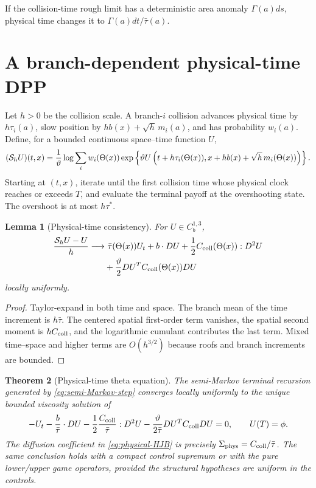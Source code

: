 \documentclass[11pt,reqno]{amsart}
\newtheorem{theorem}{Theorem}[section]
\newtheorem{lemma}[theorem]{Lemma}
\theoremstyle{definition}
\begin{document}
If the collision-time rough limit has a deterministic area anomaly
$\Gamma(a)ds$, physical time changes it to
$\Gamma(a)dt/\bar\tau(a)$.

\section{A branch-dependent physical-time DPP}

Let $h>0$ be the collision scale.  A branch-$i$ collision advances physical
time by $h\tau_i(a)$, slow position by
$hb(x)+\sqrt h\,m_i(a)$, and has probability $w_i(a)$.  Define, for a bounded
continuous space--time function $U$,
\begin{equation}\label{eq:semi-Markov-step}
 (\mathcal S_hU)(t,x)=
 {1\over\vartheta}\log
 \sum_iw_i(\Theta(x))
 \exp\left\{\vartheta
 U\left(t+h\tau_i(\Theta(x)),
 x+hb(x)+\sqrt h\,m_i(\Theta(x))\right)\right\}.
\end{equation}
Starting at $(t,x)$, iterate until the first collision time whose physical clock
reaches or exceeds $T$, and evaluate the terminal payoff at the overshooting
state.  The overshoot is at most $h\tau^*$.

\begin{lemma}[Physical-time consistency]\label{lem:physical-consistency}
For $U\in C_b^{1,3}$,
\begin{align}
 {\mathcal S_hU-U\over h}
 \longrightarrow&\ 
 \bar\tau(\Theta(x))U_t+b\cdot DU
 +{1\over2}C_{\rm coll}(\Theta(x)):D^2U\\
 &+{\vartheta\over2}
 DU^TC_{\rm coll}(\Theta(x))DU
 \label{eq:physical-consistency}
\end{align}
locally uniformly.
\end{lemma}

\begin{proof}
Taylor-expand in both time and space.  The branch mean of the time increment is
$h\bar\tau$.  The centered spatial first-order term vanishes, the spatial
second moment is $hC_{\rm coll}$, and the logarithmic cumulant contributes the
last term.  Mixed time--space and higher terms are $O(h^{3/2})$ because roofs
and branch increments are bounded.
\end{proof}

\begin{theorem}[Physical-time theta equation]\label{thm:physical-HJB}
The semi-Markov terminal recursion generated by
\eqref{eq:semi-Markov-step} converges locally uniformly to the unique bounded
viscosity solution of
\begin{equation}\label{eq:physical-HJB}
 -U_t-{b\over\bar\tau}\cdot DU
 -{1\over2}{C_{\rm coll}\over\bar\tau}:D^2U
 -{\vartheta\over2\bar\tau}
 DU^TC_{\rm coll}DU=0,
 \qquad U(T)=\phi.
\end{equation}
The diffusion coefficient in \eqref{eq:physical-HJB} is precisely
$\Sigma_{\rm phys}=C_{\rm coll}/\bar\tau$.  The same conclusion holds with a
compact control supremum or with the pure lower/upper game operators, provided
the structural hypotheses are uniform in the controls.
\end{theorem}
\end{document}
